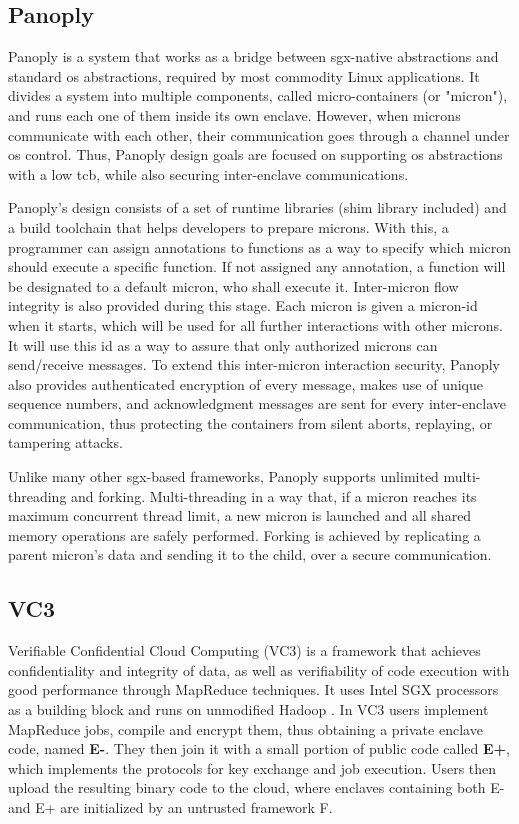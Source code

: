 \subsection{Panoply}
\label{ssec:panoply}

Panoply \cite{panoplyPaper} is a system that works as a bridge between \gls{sgx}-native abstractions and standard \gls{os} abstractions, required by most commodity Linux applications. 
It divides a system into multiple components, called micro-containers (or "micron"), and runs each one of them inside its own enclave. 
However, when microns communicate with each other, their communication goes through a channel under \gls{os} control. Thus, Panoply design goals are focused on supporting \gls{os} abstractions with a low \gls{tcb}, while also securing inter-enclave communications.

Panoply's design consists of a set of runtime libraries (shim library included) and a build toolchain that helps developers to prepare microns.
With this, a programmer can assign annotations to functions as a way to specify which micron should execute a specific function. If not assigned any annotation, a function will be designated to a default micron, who shall execute it. Inter-micron flow integrity is also provided during this stage. 
Each micron is given a micron-id when it starts, which will be used for all further interactions with other microns. It will use this id as a way to assure that only authorized microns can send/receive messages.
To extend this inter-micron interaction security, Panoply also provides authenticated encryption of every message, makes use of unique sequence numbers, and acknowledgment messages are sent for every inter-enclave communication, thus protecting the containers from silent aborts, replaying, or tampering attacks.

Unlike many other \gls{sgx}-based frameworks, Panoply supports unlimited multi-threading and forking. Multi-threading in a way that, if a micron reaches its maximum concurrent thread limit, a new micron is launched and all shared memory operations are safely performed. Forking is achieved by replicating a parent micron's data and sending it to the child, over a secure communication. 


\subsection{VC3}
\label{ssec:vc3_mapreduce}

Verifiable Confidential Cloud Computing (VC3) \cite{vc3Paper} is a framework that achieves confidentiality and integrity of data, as well as verifiability of code execution with good performance through MapReduce \cite{mapReduce} techniques. It uses Intel SGX processors as a building block and runs on unmodified Hadoop \cite{hadoop}.
In VC3 users implement MapReduce jobs, compile and encrypt them, thus obtaining a private enclave code, named \textbf{E-}. They then join it with a small portion of public code called \textbf{E+}, which implements the protocols for key exchange and job execution.
Users then upload the resulting binary code to the cloud, where enclaves containing both E- and E+ are initialized by an untrusted framework F. 

